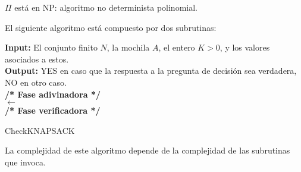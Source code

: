 \begin{frame}{$\Pi$ está en NP: algoritmo no determinista polinomial.}

  El siguiente algoritmo está compuesto por dos subrutinas:
  
  \begin{algorithm}[H]
    \textbf{Input: } El conjunto finito $N$, la mochila $A$, el entero $K > 0$,
    y los valores asociados a estos. \\
    \textbf{Output: } YES en caso que la respuesta a la pregunta de
    decisión sea verdadera, NO en otro caso.\\
    \textbf{/* Fase adivinadora */}\\
     $\leftarrow$ \\
    
    \textbf{/* Fase verificadora */}\\
    \Return {}
    \caption{CheckKNAPSACK}
  \end{algorithm}
  
  La complejidad de este algoritmo depende de la complejidad de las subrutinas que invoca.

        

    
    
    
\end{frame}

